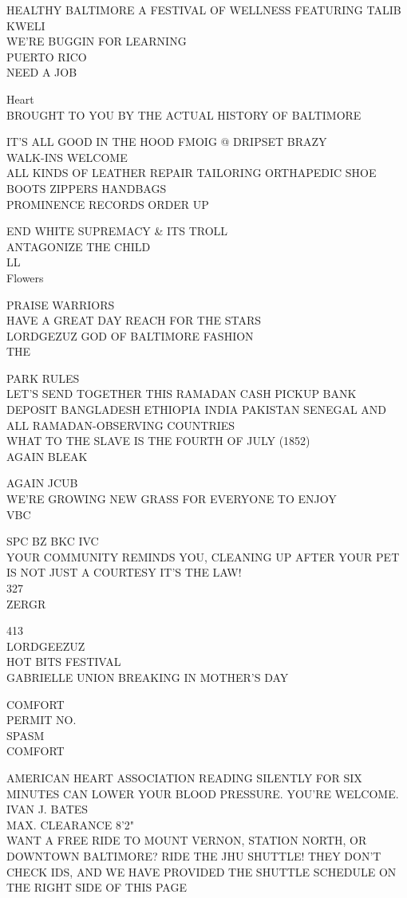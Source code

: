 \documentclass[10pt,letterpaper]{article}
\begin{document}
HEALTHY BALTIMORE A FESTIVAL OF WELLNESS FEATURING TALIB KWELI\\
WE'RE BUGGIN FOR LEARNING\\
PUERTO RICO\\
NEED A JOB

Heart\\
BROUGHT TO YOU BY THE ACTUAL HISTORY OF BALTIMORE

IT'S ALL GOOD IN THE HOOD FMOIG @ DRIPSET BRAZY\\
WALK{-}INS WELCOME\\
ALL KINDS OF LEATHER REPAIR TAILORING ORTHAPEDIC  SHOE BOOTS ZIPPERS HANDBAGS\\
PROMINENCE RECORDS ORDER UP

END WHITE SUPREMACY \& ITS TROLL\\
ANTAGONIZE THE CHILD\\
LL\\
Flowers

PRAISE WARRIORS\\
HAVE A GREAT DAY REACH FOR THE STARS\\
LORDGEZUZ GOD OF BALTIMORE FASHION\\
THE

PARK RULES\\
LET'S SEND TOGETHER THIS RAMADAN CASH PICKUP BANK DEPOSIT BANGLADESH ETHIOPIA INDIA PAKISTAN SENEGAL AND ALL RAMADAN{-}OBSERVING COUNTRIES\\
WHAT TO THE SLAVE IS THE FOURTH OF JULY (1852)\\
AGAIN BLEAK

AGAIN JCUB\\
WE'RE GROWING NEW GRASS FOR EVERYONE TO ENJOY\\
VBC

SPC BZ BKC IVC\\
YOUR COMMUNITY REMINDS YOU, CLEANING UP AFTER YOUR PET IS NOT JUST A COURTESY IT'S THE LAW!\\
327\\
ZERGR

413\\
LORDGEEZUZ\\
HOT BITS FESTIVAL\\
GABRIELLE UNION BREAKING IN MOTHER'S DAY

COMFORT\\
PERMIT NO.\\
SPASM\\
COMFORT

AMERICAN HEART ASSOCIATION READING SILENTLY FOR SIX MINUTES CAN LOWER YOUR BLOOD PRESSURE.  YOU'RE WELCOME.\\
IVAN J. BATES\\
MAX. CLEARANCE 8'2"\\
WANT A FREE RIDE TO MOUNT VERNON, STATION NORTH, OR DOWNTOWN BALTIMORE?  RIDE THE JHU SHUTTLE!  THEY DON'T CHECK IDS, AND WE HAVE PROVIDED THE SHUTTLE SCHEDULE ON THE RIGHT SIDE OF THIS PAGE
\end{document}
